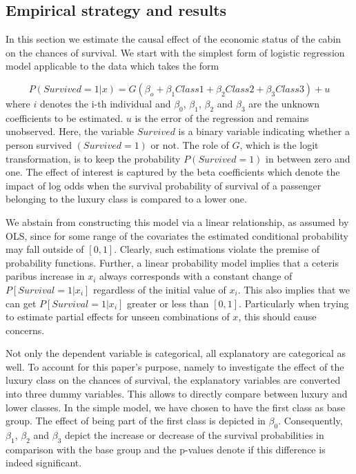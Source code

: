 \documentclass[
]{article}
\begin{document}
\hypertarget{empirical-strategy-and-results}{%
\subsection{Empirical strategy and
results}\label{empirical-strategy-and-results}}

In this section we estimate the causal effect of the economic status of
the cabin on the chances of survival. We start with the simplest form of
logistic regression model applicable to the data which takes the form

\[P(Survived = 1|x)= G(\beta_o + \beta_1Class1 + \beta_2Class2 + \beta_3Class3) + u\]
where \(i\) denotes the i-th individual and \(\beta_0\), \(\beta_1\),
\(\beta_2\) and \(\beta_3\) are the unknown coefficients to be
estimated. \(u\) is the error of the regression and remains unobserved.
Here, the variable \(Survived\) is a binary variable indicating whether
a person survived \((Survived = 1)\) or not. The role of \(G\), which is
the logit transformation, is to keep the probability \(P(Survived = 1)\)
in between zero and one. The effect of interest is captured by the beta
coefficients which denote the impact of log odds when the survival
probability of survival of a passenger belonging to the luxury class is
compared to a lower one.

We abstain from constructing this model via a linear relationship, as
assumed by OLS, since for some range of the covariates the estimated
conditional probability may fall outside of \([0,1]\). Clearly, such
estimations violate the premise of probability functions. Further, a
linear probability model implies that a ceteris paribus increase in
\(x_i\) always corresponds with a constant change of
\(P[Survival=1|x_i]\) regardless of the initial value of \(x_i\). This
also implies that we can get \(P[Survival=1|x_i]\) greater or less than
\([0,1]\). Particularly when trying to estimate partial effects for
unseen combinations of \(x\), this should cause concerns.

Not only the dependent variable is categorical, all explanatory are
categorical as well. To account for this paper's purpose, namely to
investigate the effect of the luxury class on the chances of survival,
the explanatory variables are converted into three dummy variables. This
allows to directly compare between luxury and lower classes. In the
simple model, we have chosen to have the first class as base group. The
effect of being part of the first class is depicted in \(\beta_0\).
Consequently, \(\beta_1\), \(\beta_2\) and \(\beta_3\) depict the
increase or decrease of the survival probabilities in comparison with
the base group and the p-values denote if this difference is indeed
significant.
\end{document}
